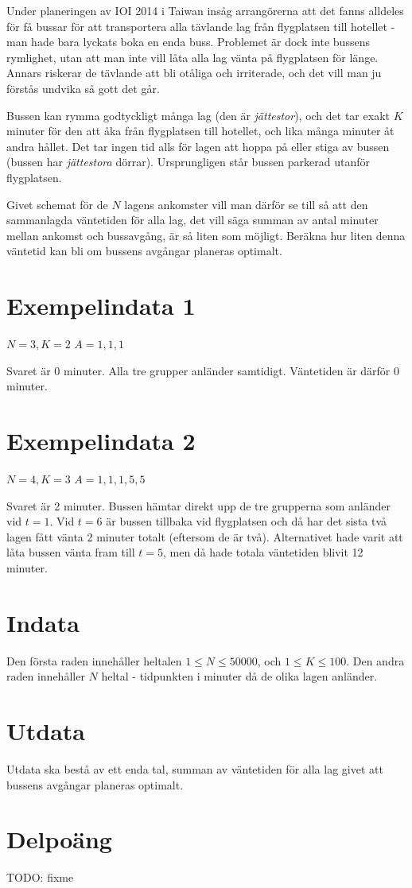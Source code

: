 
Under planeringen av IOI 2014 i Taiwan insåg arrangörerna att det fanns alldeles för få bussar för att transportera alla tävlande lag från flygplatsen till hotellet - man hade bara lyckats boka en enda buss. Problemet är dock inte bussens rymlighet, utan att man inte vill låta alla lag vänta på flygplatsen för länge. Annars riskerar de tävlande att bli otåliga och irriterade, och det vill man ju förstås undvika så gott det går.

Bussen kan rymma godtyckligt många lag (den är \emph{jättestor}), och det tar exakt $K$ minuter för den att åka från flygplatsen till hotellet, och lika många minuter åt andra hållet. Det tar ingen tid alls för lagen att hoppa på eller stiga av bussen (bussen har \emph{jättestora} dörrar). Ursprungligen står bussen parkerad utanför flygplatsen.

Givet schemat för de $N$ lagens ankomster vill man därför se till så att den sammanlagda väntetiden för alla lag, det vill säga summan av antal minuter mellan ankomst och bussavgång, är så liten som möjligt. Beräkna hur liten denna väntetid kan bli om bussens avgångar planeras optimalt.

\section*{Exempelindata 1}
$N = 3, K = 2$
$A = {1, 1, 1}$

Svaret är 0 minuter. Alla tre grupper anländer samtidigt. Väntetiden är därför 0 minuter.

\section*{Exempelindata 2}
$N = 4, K = 3$
$A = {1, 1, 1, 5, 5}$

Svaret är 2 minuter. Bussen hämtar direkt upp de tre grupperna som anländer vid $t = 1$. Vid $t = 6$ är bussen tillbaka vid flygplatsen och då har det sista två lagen fått vänta 2 minuter totalt (eftersom de är två). Alternativet hade varit att låta bussen vänta fram till $t = 5$, men då hade totala väntetiden blivit 12 minuter.

\section*{Indata}
Den första raden innehåller heltalen $1 \leq N \leq 50 000$, och $1 \leq K \leq 100$.
Den andra raden innehåller $N$ heltal - tidpunkten i minuter då de olika lagen anländer.

\section*{Utdata}
Utdata ska bestå av ett enda tal, summan av väntetiden för alla lag givet att bussens avgångar planeras optimalt.

\section*{Delpoäng}
TODO: fixme
